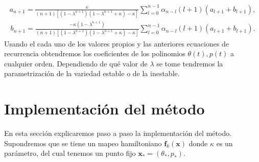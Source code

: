 \begin{eqnarray}
a_{n+1}=\frac{\kappa}{(n+1)[(1-\lambda^{n+1})(1-\lambda^{n+1}+\kappa)-\kappa]}\sum_{l=0}^{n-1}\alpha_{n-l}(l+1)(a_{l+1}+b_{l+1}),
\end{eqnarray}
\begin{eqnarray}
b_{n+1}=\frac{-\kappa(1-\lambda^{n+1})}{(n+1)[(1-\lambda^{n+1})(1-\lambda^{n+1}+\kappa)-\kappa]}\sum_{l=0}^{n-1}\alpha_{n-l}(l+1)(a_{l+1}+b_{l+1}).
\end{eqnarray}
Usando el cada uno de los valores propios y las anteriores ecuaciones de recurrencia obtendremos los coeficientes de los polinomios $\theta(t),p(t)$ a cualquier orden. Dependiendo de qué valor de $\lambda$ se tome tendremos la parametrización de la variedad estable o de la inestable.






\section{Implementación del método}
En esta sección explicaremos paso a paso la implementación del método. Supondremos que se tiene un mapeo hamiltoniano $\mathbf{f}_{k}(\mathbf{x})$ donde $\kappa$  es un parámetro, del cual tenemos un punto fijo $\mathbf{x}_{*}=(\theta_{*},p_{*})$.\\
\linebreak



